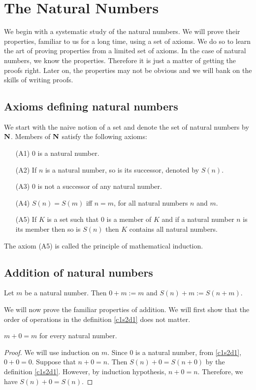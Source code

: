 \chapter{The Natural Numbers}\label{c1}
We begin with a systematic study of the natural numbers. We will prove their
properties, familiar to us for a long time, using a set of axioms. We do so
to learn the art of proving properties from a limited set of axioms. In the 
case of natural numbers, we know the properties. Therefore it is just a 
matter of getting the proofs right. Later on, the properties may not be 
obvious and we will bank on the skills of writing proofs.

\section{Axioms defining natural numbers}\label{c1s1}
We start with the naive notion of a set and denote the set of natural 
numbers by $\mathbf{N}$. Members of $\mathbf{N}$ satisfy the following axioms:
\begin{enumerate}
\item[(A1)] $0$ is a natural number.
\item[(A2)] If $n$ is a natural number, so is its successor, denoted by 
$S(n)$.
\item[(A3)] $0$ is not a successor of any natural number.
\item[(A4)] $S(n) = S(m)$ iff $n = m$, for all natural numbers $n$ and $m$.
\item[(A5)] If $K$ is a set such that $0$ is a member of $K$ and if a 
natural number $n$ is its member then so is $S(n)$ then $K$ contains all 
natural numbers.
\end{enumerate}
The axiom (A5) is called the principle of mathematical induction.

\section{Addition of natural numbers}\label{c1s2}
\begin{defn}\label{c1s2d1}
Let $m$ be a natural number. Then $0 + m := m$ and $S(n) + m := S(n + m)$.
\end{defn}

We will now prove the familiar properties of addition. We will first show 
that the order of operations in the definition \ref{c1s2d1} does not matter.
\begin{prop}\label{c1s2p1}
$m + 0 = m$ for every natural number.
\end{prop}
\begin{proof}
We will use induction on $m$. Since $0$ is a natural number, from 
\ref{c1s2d1}, $0 + 0 = 0$. Suppose that $n + 0 = n$. Then $S(n) + 0 = 
S(n + 0)$ by the definition \ref{c1s2d1}. However, by induction hypothesis, 
$n + 0 = n$. Therefore, we have $S(n) + 0 = S(n)$.
\end{proof}

